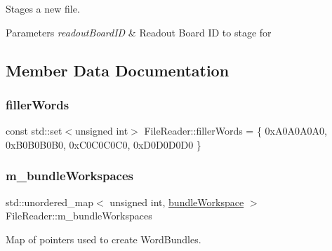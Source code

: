 Stages a new file. 


\begin{DoxyParams}{Parameters}
{\em readout\+Board\+ID} & Readout Board ID to stage for \\
\hline
\end{DoxyParams}


\subsection{Member Data Documentation}
\mbox{\label{class_file_reader_a7a0bb5e7cb117f6a415f005665893509}} 
\subsubsection{\texorpdfstring{filler\+Words}{fillerWords}}
{\footnotesize\ttfamily const std\+::set$<$unsigned int$>$ File\+Reader\+::filler\+Words = \{ 0x\+A0\+A0\+A0\+A0, 0x\+B0\+B0\+B0\+B0, 0x\+C0\+C0\+C0\+C0, 0x\+D0\+D0\+D0\+D0 \}\hspace{0.3cm}{\ttfamily [private]}}

\mbox{\label{class_file_reader_aa04e6f9a40c9186cae2c89352e75d69c}} 
\subsubsection{\texorpdfstring{m\+\_\+bundle\+Workspaces}{m\_bundleWorkspaces}}
{\footnotesize\ttfamily std\+::unordered\+\_\+map$<$ unsigned int, \hyperlink{class_file_reader_a7fb625dc45cee3256d37cc19c65cad86}{bundle\+Workspace} $>$ File\+Reader\+::m\+\_\+bundle\+Workspaces\hspace{0.3cm}{\ttfamily [private]}}



Map of pointers used to create Word\+Bundles. 

\mbox{\label{class_file_reader_a2d560dd766f6866a1c11cc44e059c246}} 
